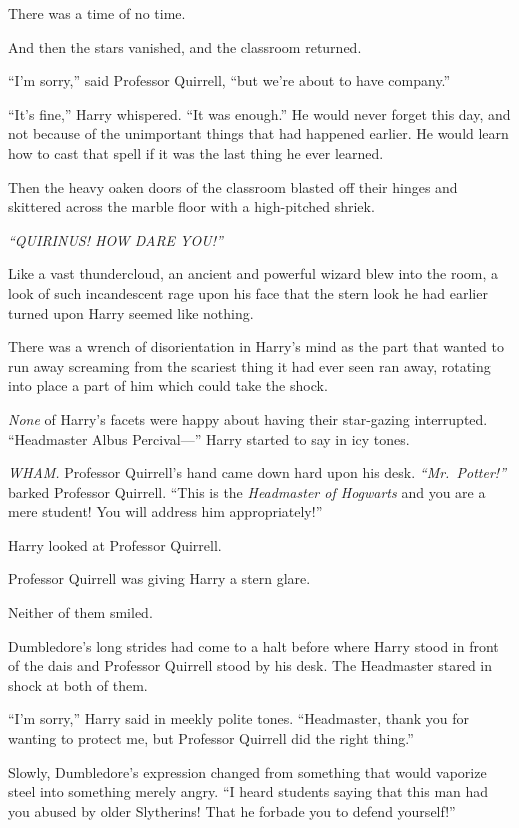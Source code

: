 There was a time of no time.

And then the stars vanished, and the classroom returned.

``I'm sorry,'' said Professor Quirrell, ``but we're about to have
company.''

``It's fine,'' Harry whispered. ``It was enough.'' He would never forget
this day, and not because of the unimportant things that had happened
earlier. He would learn how to cast that spell if it was the last thing
he ever learned.

Then the heavy oaken doors of the classroom blasted off their hinges and
skittered across the marble floor with a high-pitched shriek.

\emph{``QUIRINUS! HOW DARE YOU!''}

Like a vast thundercloud, an ancient and powerful wizard blew into the
room, a look of such incandescent rage upon his face that the stern look
he had earlier turned upon Harry seemed like nothing.

There was a wrench of disorientation in Harry's mind as the part that
wanted to run away screaming from the scariest thing it had ever seen
ran away, rotating into place a part of him which could take the shock.

\emph{None} of Harry's facets were happy about having their star-gazing
interrupted. ``Headmaster Albus Percival---'' Harry started to say in
icy tones.

\emph{WHAM.} Professor Quirrell's hand came down hard upon his desk.
\emph{``Mr.~Potter!''} barked Professor Quirrell. ``This is the
\emph{Headmaster of Hogwarts} and you are a mere student! You will
address him appropriately!''

Harry looked at Professor Quirrell.

Professor Quirrell was giving Harry a stern glare.

Neither of them smiled.

Dumbledore's long strides had come to a halt before where Harry stood in
front of the dais and Professor Quirrell stood by his desk. The
Headmaster stared in shock at both of them.

``I'm sorry,'' Harry said in meekly polite tones. ``Headmaster, thank
you for wanting to protect me, but Professor Quirrell did the right
thing.''

Slowly, Dumbledore's expression changed from something that would
vaporize steel into something merely angry. ``I heard students saying
that this man had you abused by older Slytherins! That he forbade you to
defend yourself!''

